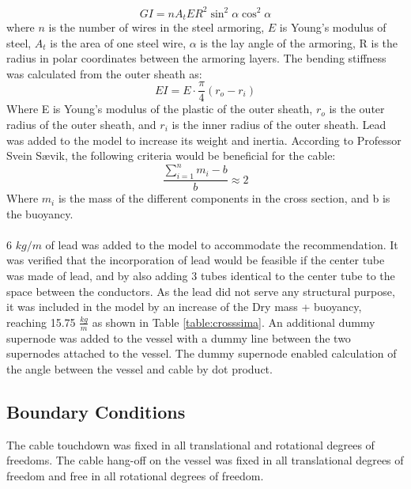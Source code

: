 \begin{equation}
    GI=nA_t E R^2 \sin^2 \alpha \cos^2 \alpha
\end{equation}
where $n$ is the number of wires in the steel armoring, $E$ is Young's modulus of steel, $A_t$ is the area of one steel wire, $\alpha$ is the lay angle of the armoring, R is the radius in polar coordinates between the armoring layers.  \newline
\newline 
The bending stiffness was calculated from the outer sheath as:
\begin{equation}
    EI= E\cdot \frac{\pi}{4}(r_o-r_i)
\end{equation}
Where E is Young's modulus of the plastic of the outer sheath, $r_o$ is the outer radius of the outer sheath, and $r_i$ is the inner radius of the outer sheath. \newline
\newline 
Lead was added to the model to increase its weight and inertia. According to Professor Svein Sævik, the following criteria would be beneficial for the cable:
\begin{equation}
    \frac{\sum_{i=1}^n m_i - b}{b}\approx 2
\end{equation}
Where $m_i$ is the mass of the different components in the cross section, and b is the buoyancy.\\\\ 6 $kg/m$ of lead was added to the model to accommodate the recommendation. It was verified that the incorporation of lead would be feasible if the center tube was made of lead, and by also adding 3 tubes identical to the center tube to the space between the conductors. As the lead did not serve any structural purpose, it was included in the model by an increase of the Dry mass + buoyancy, reaching 15.75 $\frac{kg}{m}$ as shown in Table \ref{table:crosssima}. \newline
\newline An additional dummy supernode was added to the vessel with a dummy line between the two supernodes attached to the vessel. The dummy supernode enabled calculation of the angle between the vessel and cable by dot product. 

\subsection{Boundary Conditions}
The cable touchdown was fixed in all translational and rotational degrees of freedoms. The cable hang-off on the vessel was fixed in all translational degrees of freedom and free in all rotational degrees of freedom. 

